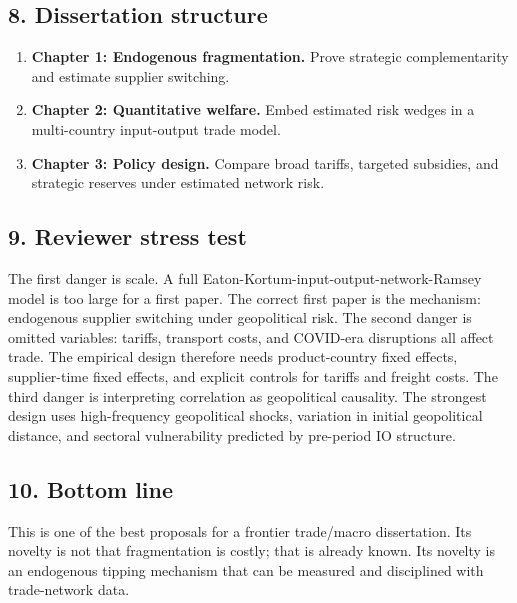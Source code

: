 \documentclass[11pt]{article}
\begin{document}
\subsection*{8. Dissertation structure}
\begin{enumerate}[leftmargin=*]
\item \textbf{Chapter 1: Endogenous fragmentation.} Prove strategic complementarity and estimate supplier switching.
\item \textbf{Chapter 2: Quantitative welfare.} Embed estimated risk wedges in a multi-country input-output trade model.
\item \textbf{Chapter 3: Policy design.} Compare broad tariffs, targeted subsidies, and strategic reserves under estimated network risk.
\end{enumerate}

\subsection*{9. Reviewer stress test}
The first danger is scale. A full Eaton-Kortum-input-output-network-Ramsey model is too large for a first paper. The correct first paper is the mechanism: endogenous supplier switching under geopolitical risk. The second danger is omitted variables: tariffs, transport costs, and COVID-era disruptions all affect trade. The empirical design therefore needs product-country fixed effects, supplier-time fixed effects, and explicit controls for tariffs and freight costs. The third danger is interpreting correlation as geopolitical causality. The strongest design uses high-frequency geopolitical shocks, variation in initial geopolitical distance, and sectoral vulnerability predicted by pre-period IO structure.

\subsection*{10. Bottom line}
This is one of the best proposals for a frontier trade/macro dissertation. Its novelty is not that fragmentation is costly; that is already known. Its novelty is an endogenous tipping mechanism that can be measured and disciplined with trade-network data.


\newpage
\printbibliography
\end{document}
